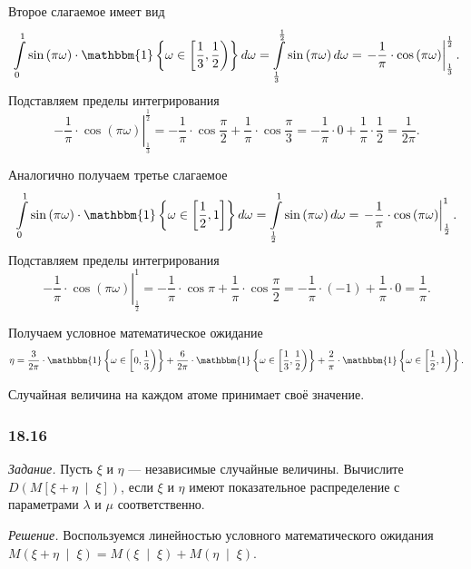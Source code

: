Второе слагаемое имеет вид
$$ \int \limits_0^1
  \sin \left( \pi \omega \right) \cdot
  \mathbbm{1} \left\{ \omega \in \left[ \frac{1}{3}, \frac{1}{2} \right) \right\} d \omega =
  \int \limits_{ \frac{1}{3}}^{ \frac{1}{2}} \sin \left( \pi \omega \right) d \omega =
  \left.
    - \frac{1}{ \pi } \cdot \cos \left( \pi \omega \right)
  \right|_{ \frac{1}{3}}^{ \frac{1}{2}}.$$
Подставляем пределы интегрирования
$$ \left.
    - \frac{1}{ \pi } \cdot \cos \left( \pi \omega \right)
  \right|_{ \frac{1}{3}}^{ \frac{1}{2}} =
  - \frac{1}{ \pi } \cdot \cos \frac{ \pi }{2} + \frac{1}{ \pi } \cdot \cos \frac{ \pi }{3} =
  - \frac{1}{ \pi } \cdot 0 + \frac{1}{ \pi } \cdot \frac{1}{2} =
  \frac{1}{2 \pi }.$$

Аналогично получаем третье слагаемое
$$ \int \limits_0^1
    \sin \left( \pi \omega \right) \cdot
    \mathbbm{1} \left\{ \omega \in \left[ \frac{1}{2}, 1 \right] \right\} d \omega =
  \int \limits_{ \frac{1}{2}}^1 \sin \left( \pi \omega \right) d \omega =
  \left. - \frac{1}{ \pi } \cdot \cos \left( \pi \omega \right) \right|_{ \frac{1}{2}}^1.$$
Подставляем пределы интегрирования
$$ \left. - \frac{1}{ \pi } \cdot \cos \left( \pi \omega \right) \right|_{ \frac{1}{2}}^1 =
  - \frac{1}{ \pi } \cdot \cos \pi + \frac{1}{ \pi } \cdot \cos \frac{ \pi }{2} =
  - \frac{1}{ \pi } \cdot \left( -1 \right) + \frac{1}{ \pi } \cdot 0 =
  \frac{1}{ \pi }.$$

Получаем условное математическое ожидание
$$ \eta =
  \frac{3}{2 \pi } \cdot
  \mathbbm{1} \left\{ \omega \in \left[ 0, \frac{1}{3} \right) \right\} +
  \frac{6}{2 \pi } \cdot
  \mathbbm{1} \left\{ \omega \in \left[ \frac{1}{3}, \frac{1}{2} \right) \right\} +
  \frac{2}{ \pi } \cdot
  \mathbbm{1} \left\{ \omega \in \left[ \frac{1}{2}, 1 \right) \right\}.$$

Случайная величина на каждом атоме принимает своё значение.

\subsubsection*{18.16}

\textit{Задание.} Пусть $ \xi $ и $ \eta $ --- независимые случайные величины.
Вычислите $D \left( M \left[ \xi + \eta \; \middle| \; \xi \right] \right) $,
если $ \xi $ и $ \eta $ имеют показательное распределение с параметрами $ \lambda $
и $ \mu $ соответственно.

\textit{Решение.}
Воспользуемся линейностью условного математического ожидания
$M \left( \xi + \eta \; \middle| \; \xi \right) =
  M \left( \xi \; \middle| \; \xi \right) + M \left( \eta \; \middle| \; \xi \right) $.

